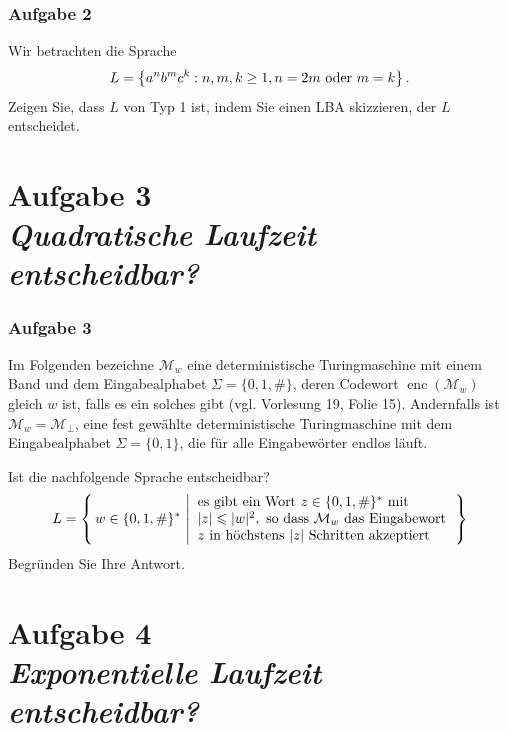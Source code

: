 \documentclass{beamer}
\begin{document}
	\begin{frame} \frametitle{Aufgabe 2}
		\small
		Wir betrachten die Sprache 
		\begin{equation*}
			L = \left\{ a^n b^m c^k : n,m,k \ge 1, n = 2m \text{ oder } m = k \right\} .
		\end{equation*}
		Zeigen Sie, dass $L$ von Typ 1 ist, indem Sie einen LBA skizzieren, der $L$ entscheidet.
	
		
	\end{frame}

	

	\section{Aufgabe 3 \\ \itshape Quadratische Laufzeit entscheidbar?}

	
	\begin{frame} \frametitle{Aufgabe 3}
		\small
		\justifying
		Im Folgenden bezeichne $\mathcal{M}_w$ eine deterministische 
		Turingmaschine mit einem Band und dem Eingabe\-alphabet $\Sigma=\{0,1,\#\}$, deren Codewort $\operatorname{enc}(\mathcal{M}_w)$ 
		gleich $w$ ist, falls es ein solches gibt (vgl. Vorlesung 19, Folie 15).
		Andernfalls ist $\mathcal{M}_w = \mathcal{M}_{\bot}$, eine fest 
		gew\"ahlte deterministische Turingmaschine 
		mit dem Eingabealphabet $\Sigma=\{0,1\}$, die f\"ur alle 
		Eingabewörter endlos läuft.
		
		Ist die nachfolgende Sprache entscheidbar?
		\begin{equation*}
			\setlength\arraycolsep{2pt}
			L = \left\{ \, w \in \{0,1,\#\}^\ast  \, \left\vert \
			\begin{array}{l}
			\text{es gibt ein Wort } z \in \{0,1,\#\}^\ast \text{ mit} \\
			|z| \leqslant |w|^2, \text{ so dass } \mathcal{M}_w \text{ das Eingabewort } \\
			z \text{ in höchstens } |z| \text{ Schritten akzeptiert}
			\end{array}
			\right.\right\}
		\end{equation*}
		Begründen Sie Ihre Antwort.
	\end{frame}

	\section{Aufgabe 4 \\ \itshape Exponentielle Laufzeit entscheidbar?}
	
\end{document}
